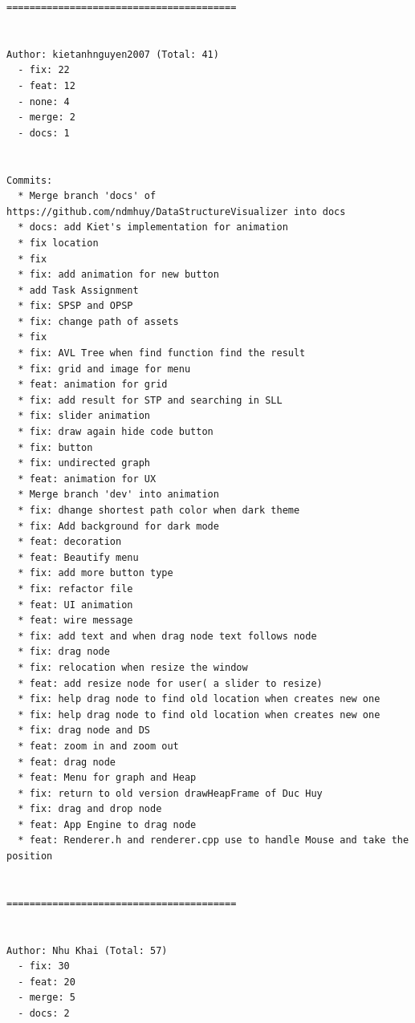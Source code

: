 \begin{small}
\begin{verbatim}
========================================


Author: kietanhnguyen2007 (Total: 41)
  - fix: 22
  - feat: 12
  - none: 4
  - merge: 2
  - docs: 1


Commits:
  * Merge branch 'docs' of https://github.com/ndmhuy/DataStructureVisualizer into docs
  * docs: add Kiet's implementation for animation
  * fix location
  * fix
  * fix: add animation for new button
  * add Task Assignment
  * fix: SPSP and OPSP
  * fix: change path of assets
  * fix
  * fix: AVL Tree when find function find the result
  * fix: grid and image for menu
  * feat: animation for grid
  * fix: add result for STP and searching in SLL
  * fix: slider animation
  * fix: draw again hide code button
  * fix: button
  * fix: undirected graph
  * feat: animation for UX
  * Merge branch 'dev' into animation
  * fix: dhange shortest path color when dark theme
  * fix: Add background for dark mode
  * feat: decoration
  * feat: Beautify menu
  * fix: add more button type
  * fix: refactor file
  * feat: UI animation
  * feat: wire message
  * fix: add text and when drag node text follows node
  * fix: drag node
  * fix: relocation when resize the window
  * feat: add resize node for user( a slider to resize)
  * fix: help drag node to find old location when creates new one
  * fix: help drag node to find old location when creates new one
  * fix: drag node and DS
  * feat: zoom in and zoom out
  * feat: drag node
  * feat: Menu for graph and Heap
  * fix: return to old version drawHeapFrame of Duc Huy
  * fix: drag and drop node
  * feat: App Engine to drag node
  * feat: Renderer.h and renderer.cpp use to handle Mouse and take the position


========================================


Author: Nhu Khai (Total: 57)
  - fix: 30
  - feat: 20
  - merge: 5
  - docs: 2



\end{verbatim}
\end{small}
